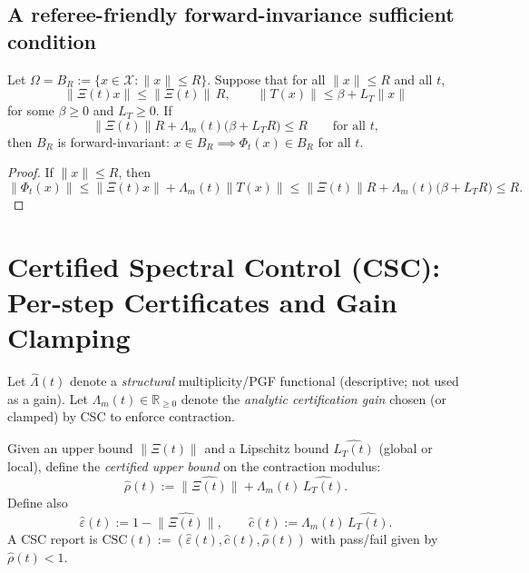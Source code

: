 \subsection{A referee-friendly forward-invariance sufficient condition}

\begin{lemma}\label{lem:ball_invariance}
Let $\Omega=B_R:=\{x\in\mathcal X:\|x\|\le R\}$. Suppose that for all $\|x\|\le R$ and all $t$,
\[
\|\Xi(t)x\|\le \|\Xi(t)\|\,R,\qquad \|T(x)\|\le \beta+L_T\|x\|
\]
for some $\beta\ge 0$ and $L_T\ge 0$. If
\[
\|\Xi(t)\|R+\Lambda_m(t)\big(\beta+L_T R\big)\le R\qquad\text{for all }t,
\]
then $B_R$ is forward-invariant: $x\in B_R\implies \Phi_t(x)\in B_R$ for all $t$.
\end{lemma}

\begin{proof}
If $\|x\|\le R$, then
\[
\|\Phi_t(x)\|\le \|\Xi(t)x\|+\Lambda_m(t)\|T(x)\|
\le \|\Xi(t)\|R+\Lambda_m(t)\big(\beta+L_T R\big)\le R.
\]
\end{proof}

\section{Certified Spectral Control (CSC): Per-step Certificates and Gain Clamping}

\begin{definition}
Let $\widehat{\Lambda}(t)$ denote a \emph{structural} multiplicity/PGF functional (descriptive; not used as a gain).
Let $\Lambda_m(t)\in\mathbb R_{\ge 0}$ denote the \emph{analytic certification gain} chosen (or clamped) by CSC to enforce contraction.
\end{definition}

\begin{definition}
Given an upper bound $\widehat{\|\Xi(t)\|}$ and a Lipschitz bound $\widehat{L_T(t)}$ (global or local), define the
\emph{certified upper bound} on the contraction modulus:
\[
\widehat{\rho}(t):=\widehat{\|\Xi(t)\|}+\Lambda_m(t)\,\widehat{L_T(t)}.
\]
Define also
\[
\widehat{\varepsilon}(t):=1-\widehat{\|\Xi(t)\|},\qquad \widehat{c}(t):=\Lambda_m(t)\,\widehat{L_T(t)}.
\]
A CSC report is $\mathrm{CSC}(t):=(\widehat{\varepsilon}(t),\widehat{c}(t),\widehat{\rho}(t))$ with pass/fail given by $\widehat{\rho}(t)<1$.
\end{definition}

